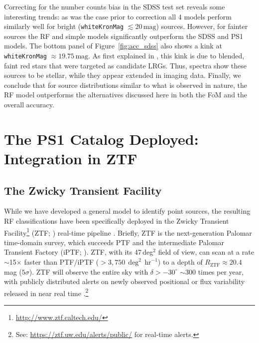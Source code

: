 \documentclass[twocolumn]{aastex62}
\begin{document}
\begin{CJK*}{UTF8}{gbsn}
Correcting for the number counts bias in the SDSS test set reveals some
interesting trends: as was the case prior to correction all 4 models perform
similarly well for bright (\texttt{whiteKronMag} $\lesssim
20\,\mathrm{mag}$) sources. However, for fainter sources the RF and simple
models significantly outperform the SDSS and PS1 models. The bottom panel of
Figure~\ref{fig:acc_sdss} also shows a kink at \texttt{whiteKronMag}
$\approx 19.75\,\mathrm{mag}$. As first explained in \citet{Miller17}, this
kink is due to blended, faint red stars that were targeted as candidate
LRGs. Thus, spectra show these sources to be stellar, while they appear
extended in imaging data. Finally, we conclude that for source distributions
similar to what is observed in nature, the RF model outperforms the
alternatives discussed here in both the FoM and the overall accuracy.


\section{The PS1 Catalog Deployed: Integration in ZTF}
\label{sec:ztf}

\subsection{The Zwicky Transient Facility}

While we have developed a general model to identify point sources, the
resulting RF classifications have been specifically deployed in the Zwicky
Transient Facility\footnote{\url{http://www.ztf.caltech.edu/}} (ZTF;
\citealt{Bellm:18:ZTF, Dekany:18:ZTF}) real-time pipeline
\citep{Masci:18:ZTF}. Briefly, ZTF is the next-generation Palomar
time-domain survey, which succeeds PTF \citep{Rau09, Law09} and the
intermediate Palomar Transient Factory (iPTF; \citealt{Kulkarni13}). ZTF,
with its 47\,deg$^2$ field of view, can scan at a rate $\sim$15$\times$
faster than PTF/iPTF ($>3{,}750\,\deg^2\,\mathrm{hr}^{-1}$) to a depth of
$R_\mathrm{ZTF} \approx 20.4$\,mag ($5\sigma$). ZTF will observe the entire
sky with $\delta > -30^{\circ}$ $\sim$300 times per year, with publicly
distributed alerts on newly observed positional or flux variability released
in near real time \citep{Patterson:18:ZTF}.\footnote{See: \url{https://ztf.uw.edu/alerts/public/} for real-time alerts.}


\end{CJK*}
\end{document}
